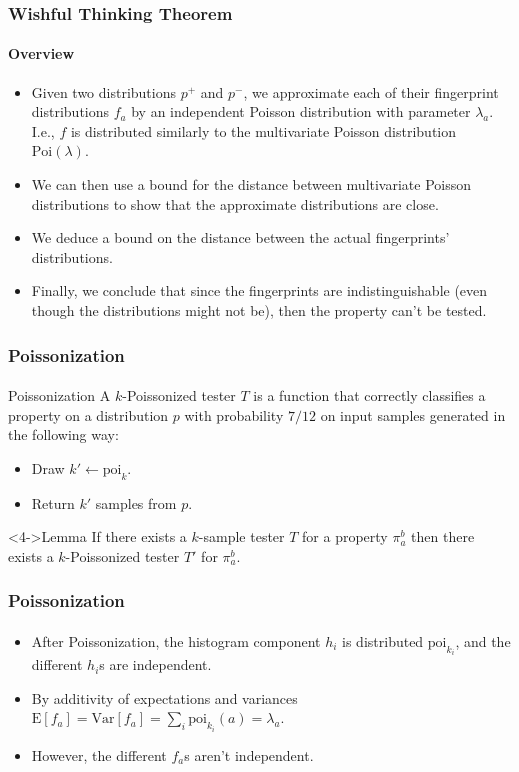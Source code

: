 \documentclass{beamer}
\newcommand{\E}{\mbox{E}} \newcommand{\Cov}{\mbox{Cov}}
\newcommand{\Var}{\mbox{Var}} \newcommand{\Varx}{\mathop{\bf Var\/}}
\begin{document}
\begin{frame}
  \frametitle{Wishful Thinking Theorem} \framesubtitle{Overview}

  \begin{itemize}
  \item<1-> Given two distributions $p^+$ and $p^-$, we approximate
    each of their fingerprint distributions $f_a$ by an independent
    Poisson distribution with parameter $\lambda_a$. I.e., $f$ is
    distributed similarly to the multivariate Poisson distribution
    $\mbox{Poi}(\lambda)$.
  \item<2-> We can then use a bound for the distance between multivariate
    Poisson distributions to show that the approximate distributions
    are close.
  \item<3-> We deduce a bound on the distance between the
    actual fingerprints' distributions.
  \item<4-> Finally, we conclude that since the fingerprints are
    indistinguishable (even though the distributions might not be),
    then the property can't be tested.
  \end{itemize}

\end{frame}

\begin{frame}
  \frametitle{Poissonization} \framesubtitle{}

  \begin{block}{Poissonization}
    A $k$-Poissonized tester $T$ is a function that correctly
    classifies a property on a distribution $p$ with probability
    $7/12$ on input samples generated in the following way:
    \begin{itemize}
    \item<2-> Draw $k'\leftarrow \mbox{poi}_k$.
    \item<3-> Return $k'$ samples from $p$.
    \end{itemize}
  \end{block}

  \begin{block}<4->{Lemma}
    If there exists a $k$-sample tester $T$ for a property $\pi_a^b$
    then there exists a $k$-Poissonized tester $T'$ for $\pi_a^b$.
  \end{block}
  
\end{frame}

\begin{frame}
  \frametitle{Poissonization} \framesubtitle{}

  
  \begin{itemize}
  \item<1-> After Poissonization, the histogram component $h_i$ is
    distributed $\mbox{poi}_{k_i}$, and the different $h_i$s are independent.
  \item<2-> By additivity of expectations and variances
    $\E[f_a]=\Var[f_a]=\sum_i\mbox{poi}_{k_i}(a)=\lambda_a$.
  \item<3-> However, the different $f_a$s aren't independent.
 \end{itemize}
  
\end{frame}
\end{document}
